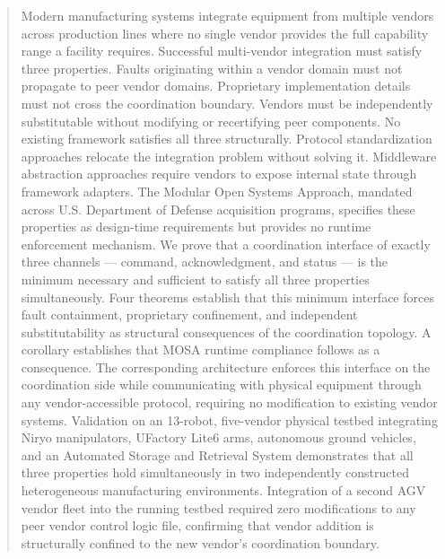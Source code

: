 \documentclass[a4paper,fleqn]{cas-dc}
\begin{document}
\fntext[1]{}


\begin{abstract}
Modern manufacturing systems integrate equipment from multiple vendors across production lines where no single vendor provides the full capability range a facility requires. Successful multi-vendor integration must satisfy three properties. Faults originating within a vendor domain must not propagate to peer vendor domains. Proprietary implementation details must not cross the coordination boundary. Vendors must be independently substitutable without modifying or recertifying peer components. No existing framework satisfies all three structurally. Protocol standardization approaches relocate the integration problem without solving it. Middleware abstraction approaches require vendors to expose internal state through framework adapters. The Modular Open Systems Approach, mandated across U.S. Department of Defense acquisition programs, specifies these properties as design-time requirements but provides no runtime enforcement mechanism. We prove that a coordination interface of exactly three channels — command, acknowledgment, and status — is the minimum necessary and sufficient to satisfy all three properties simultaneously. Four theorems establish that this minimum interface forces fault containment, proprietary confinement, and independent substitutability as structural consequences of the coordination topology. A corollary establishes that MOSA runtime compliance follows as a consequence. The corresponding architecture enforces this interface on the coordination side while communicating with physical equipment through any vendor-accessible protocol, requiring no modification to existing vendor systems. Validation on an 13-robot, five-vendor physical testbed integrating Niryo manipulators, UFactory Lite6 arms, autonomous ground vehicles, and an Automated Storage and Retrieval System demonstrates that all three properties hold simultaneously in two independently constructed heterogeneous manufacturing environments. Integration of a second AGV vendor fleet into the running testbed required zero modifications to any peer vendor control logic file, confirming that vendor addition is structurally confined to the new vendor's coordination boundary.
\end{abstract}

\end{document}
